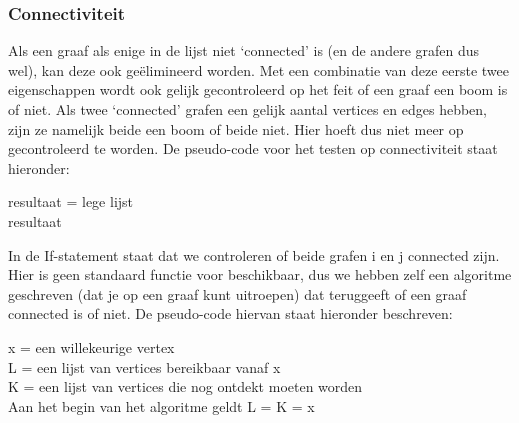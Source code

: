\documentclass{article}
\begin{document}
\subsubsection{Connectiviteit}
Als een graaf als enige in de lijst niet ‘connected’ is (en de andere grafen dus wel), kan deze ook ge\"elimineerd worden. Met een combinatie van deze eerste twee eigenschappen wordt ook gelijk gecontroleerd op het feit of een graaf een boom is of niet. Als twee ‘connected’ grafen een gelijk aantal vertices en edges hebben, zijn ze namelijk beide een boom of beide niet. Hier hoeft dus niet meer op gecontroleerd te worden. De pseudo-code voor het testen op connectiviteit staat hieronder:\\

\begin{algorithm}[H]
	resultaat = lege lijst\\
	\Return resultaat
\end{algorithm}
\vspace{5mm}

In de If-statement staat dat we controleren of beide grafen i en j connected zijn. Hier is geen standaard functie voor beschikbaar, dus we hebben zelf een algoritme geschreven (dat je op een graaf kunt uitroepen) dat teruggeeft of een graaf connected is of niet. De pseudo-code hiervan staat hieronder beschreven:\\

\begin{algorithm}[H]
	x = een willekeurige vertex\\
	L = een lijst van vertices bereikbaar vanaf x\\
	K = een lijst van vertices die nog ontdekt moeten worden\\
	Aan het begin van het algoritme geldt L = K = x\\


\end{algorithm}
\end{document}
